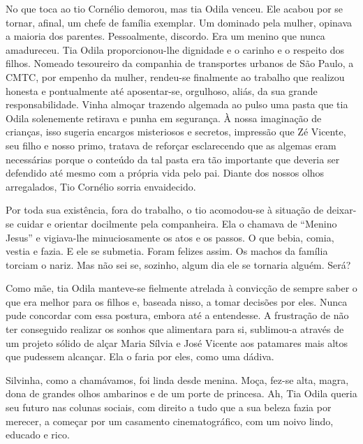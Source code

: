 No que toca ao tio Cornélio demorou, mas tia Odila venceu.
Ele acabou por se tornar, afinal, um chefe de família exemplar.
Um dominado pela mulher, opinava a maioria dos parentes.
Pessoalmente, discordo.
Era um menino que nunca amadureceu.
Tia Odila proporcionou-lhe dignidade e o carinho e o respeito dos filhos.
Nomeado tesoureiro da companhia de transportes urbanos de São Paulo, a CMTC, por empenho da mulher, rendeu-se finalmente ao trabalho que realizou honesta e pontualmente até aposentar-se, orgulhoso, aliás, da sua grande responsabilidade.
Vinha almoçar trazendo algemada ao pulso uma pasta que tia Odila solenemente retirava e punha em segurança.
À nossa imaginação de crianças, isso sugeria encargos misteriosos e secretos, impressão que Zé Vicente, seu filho e nosso primo, tratava de reforçar esclarecendo que as algemas eram necessárias porque o conteúdo da tal pasta era tão importante que deveria ser defendido até mesmo com a própria vida pelo pai.
Diante dos nossos olhos arregalados, Tio Cornélio sorria envaidecido.


Por toda sua existência, fora do trabalho, o tio acomodou-se à situação de deixar-se cuidar e orientar docilmente pela companheira.
Ela o chamava de “Menino Jesus” e vigiava-lhe minuciosamente os atos e os passos.
O que bebia, comia, vestia e fazia.
E ele se submetia.
Foram felizes assim.
Os machos da família torciam o nariz.
Mas não sei se, sozinho, algum dia ele se tornaria alguém.
Será?

Como mãe, tia Odila manteve-se fielmente atrelada à convicção de sempre saber o que era melhor para os filhos e, baseada nisso, a tomar decisões por eles.
Nunca pude concordar com essa postura, embora até a entendesse.
A frustração de não ter conseguido realizar os sonhos que alimentara para si, sublimou-a através de um projeto sólido de alçar Maria Sílvia e José Vicente aos patamares mais altos que pudessem alcançar.
Ela o faria por eles, como uma dádiva.

Silvinha, como a chamávamos, foi linda desde menina.
Moça, fez-se alta, magra, dona de grandes olhos ambarinos e de um porte de princesa.
Ah, Tia Odila queria seu futuro nas colunas sociais, com direito a tudo que a sua beleza fazia por merecer, a começar por um casamento cinematográfico, com um noivo lindo, educado e rico.


